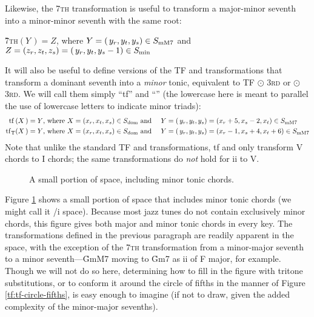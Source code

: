 {\noindent Likewise, the \textsc{7th} transformation is useful to transform a
major-minor seventh into a minor-minor seventh with the same root:

\vspace{.5\baselineskip}
  \h{7}\textsc{th}$(Y\,) = Z$, where $Y = (\,y_r, y_t, y_s) \in S_{\mathrm{mM7}}$ and
  $Z=(z_r, z_t, z_s)=(\,y_r, y_t, y_s-1) \in S_{\mathrm{min}}$
\vspace{.5\baselineskip}

\noindent It will also be useful to define versions of the TF and \tft
transformations that transform a dominant seventh into a \emph{minor} tonic,
equivalent to TF $\odot$ \textsc{3rd} or \tft $\odot$ \textsc{3rd}. We will
call them simply ``tf'' and ``\tfmt'' (the lowercase here is meant to parallel
the use of lowercase letters to indicate minor triads):
%
{\novspace%
\begin{alignat*}{3}
    \mathrm{tf}\,(X\,) = Y\text{, where}\ X = (x_r, x_t, x_s) \in S_{\mathrm{dom}}
    & \text{ and}\ &
    Y &= (\,y_r, y_t, y_s) = (x_r + 5, x_s - 2, x_t) \in S_{\mathrm{mM7}} \\
    \mathrm{tf}_\mathrm{T}(X\,) = Y\text{, where}\ X = (x_r, x_t, x_s) \in S_{\mathrm{dom}}
    & \text{ and}\ &
    Y &= (\,y_r, y_t, y_s) = (x_r - 1, x_s + 4, x_t + 6) \in S_{\mathrm{mM7}}
\end{alignat*}}%
%
Note that unlike the standard TF and \tft transformations, tf and
\tfmt only transform V chords to I chords; the same
transformations do \emph{not} hold for ii to V.

\begin{figure}[thbp]
  \caption{A small portion of \tf space, including minor tonic chords.}
  \label{tfe:tf-minor-tonics}
\end{figure}

Figure \ref{tfe:tf-minor-tonics} shows a small portion of \tf space that includes
minor tonic chords (we might call it \tfo/i space). Because most jazz tunes do
not contain exclusively minor chords, this figure gives both major and minor
tonic chords in every key. The transformations defined in the previous
paragraph are readily apparent in the space, with the exception of the
\textsc{7th} transformation from a minor-major seventh to a minor
seventh---\h{GmM7} moving to \h{Gm7} as ii of F major, for example. Though we
will not do so here, determining how to fill in the figure with tritone
substitutions, or to conform it around the circle of fifths in the manner of
Figure \ref{tf:tf-circle-fifths}, is easy enough to imagine (if not to draw,
given the added complexity of the minor-major sevenths).

}
